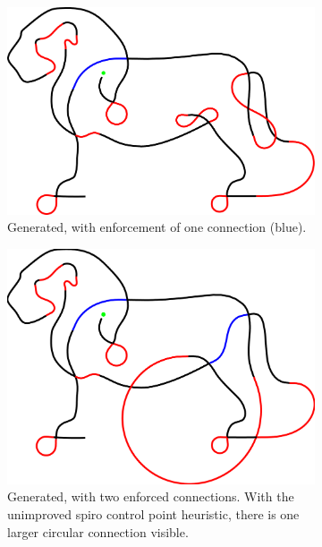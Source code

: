 \begin{figure}[h]
\begin{subfigure}[t]{0.45\textwidth}
	\includegraphics[width=\textwidth]{images/results/lion/lion_generated_enforced_connection.pdf}
	\caption{Generated, with enforcement of one connection (blue).}
\end{subfigure}
\begin{subfigure}[t]{0.45\textwidth}
	\includegraphics[width=\textwidth]{images/results/lion/lion_generated_enforced_connection_with_degen.pdf}
	\caption{Generated, with two enforced connections. With the unimproved spiro control point heuristic, there is one larger circular connection visible.}
\end{subfigure}\\
\centering
\begin{subfigure}[t]{0.8\textwidth}

\end{subfigure}
\end{figure}
